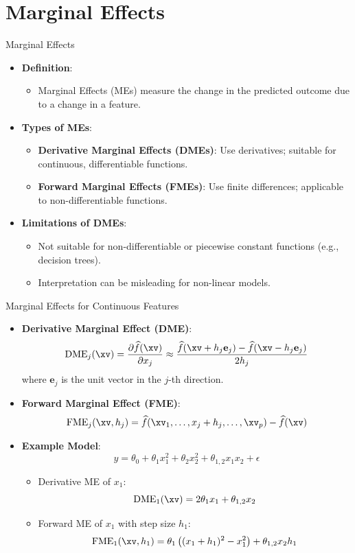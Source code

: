 \documentclass[11pt,compress,t,notes=noshow, aspectratio=169, xcolor=table]{beamer}
\begin{document}
\section{Marginal Effects}

\begin{frame}{Marginal Effects}
\begin{itemize}
\item \textbf{Definition}:
\begin{itemize}
  \item Marginal Effects (MEs) measure the change in the predicted outcome due to a change in a feature.
\end{itemize}
\item \textbf{Types of MEs}:
\begin{itemize}
  \item \textbf{Derivative Marginal Effects (DMEs)}: Use derivatives; suitable for continuous, differentiable functions.
  \item \textbf{Forward Marginal Effects (FMEs)}: Use finite differences; applicable to non-differentiable functions.
\end{itemize}
\item \textbf{Limitations of DMEs}:
\begin{itemize}
  \item Not suitable for non-differentiable or piecewise constant functions (e.g., decision trees).
  \item Interpretation can be misleading for non-linear models.
\end{itemize}
\end{itemize}
\end{frame}

\begin{frame}{Marginal Effects for Continuous Features}
\begin{itemize}
\item \textbf{Derivative Marginal Effect (DME)}:
\[
\text{DME}_j(\xv) = \frac{\partial \widehat{f}(\xv)}{\partial x_j} \approx \frac{\widehat{f}(\xv + h_j \mathbf{e}_j) - \widehat{f}(\xv - h_j \mathbf{e}_j)}{2h_j}
\]
where $\mathbf{e}_j$ is the unit vector in the $j$-th direction.
\item \textbf{Forward Marginal Effect (FME)}:
\[
\text{FME}_j(\xv, h_j) = \widehat{f}(\xv_1, \dots, x_j + h_j, \dots, \xv_p) - \widehat{f}(\xv)
\]
\item \textbf{Example Model}:
\[
y = \theta_0 + \theta_{1} x_1^2 + \theta_{2} x_2^2 + \theta_{1,2} x_1 x_2 + \epsilon
\]
\begin{itemize}
\item Derivative ME of $x_1$:
\[
\text{DME}_1(\xv) = 2\theta_1 x_1 + \theta_{1,2} x_2
\]
\item Forward ME of $x_1$ with step size $h_1$:
\[
\text{FME}_1(\xv, h_1) = \theta_1 \left( (x_1 + h_1)^2 - x_1^2 \right) + \theta_{1,2} x_2 h_1
\]
\end{itemize}
\end{itemize}
\end{frame}
\end{document}
